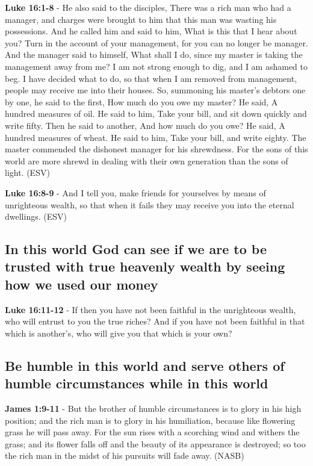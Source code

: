 \documentclass[11pt]{article}
\begin{document}
\textbf{Luke 16:1-8} - He also said to the disciples, There was a rich man who had a manager, and charges were brought to him that this man was wasting his possessions. And he called him and said to him, What is this that I hear about you? Turn in the account of your management, for you can no longer be manager. And the manager said to himself, What shall I do, since my master is taking the management away from me? I am not strong enough to dig, and I am ashamed to beg. I have decided what to do, so that when I am removed from management, people may receive me into their houses. So, summoning his master's debtors one by one, he said to the first, How much do you owe my master? He said, A hundred measures of oil. He said to him, Take your bill, and sit down quickly and write fifty. Then he said to another, And how much do you owe? He said, A hundred measures of wheat. He said to him, Take your bill, and write eighty. The master commended the dishonest manager for his shrewdness. For the sons of this world are more shrewd in dealing with their own generation than the sons of light. (ESV)

\textbf{Luke 16:8-9} - And I tell you, make friends for yourselves by means of unrighteous wealth, so that when it fails they may receive you into the eternal dwellings. (ESV)

\subsection{In this world God can see if we are to be trusted with true heavenly wealth by seeing how we used our money}
\label{sec:org2bff27b}
\textbf{Luke 16:11-12} - If then you have not been faithful in the unrighteous wealth, who will entrust to you the true riches? And if you have not been faithful in that which is another's, who will give you that which is your own?

\subsection{Be humble in this world and serve others of humble circumstances while in this world}
\label{sec:orgd080077}
\textbf{James 1:9-11} - But the brother of humble circumstances is to glory in his high position; and the rich man is to glory in his humiliation, because like flowering grass he will pass away. For the sun rises with a scorching wind and withers the grass; and its flower falls off and the beauty of its appearance is destroyed; so too the rich man in the midst of his pursuits will fade away. (NASB)
\end{document}
